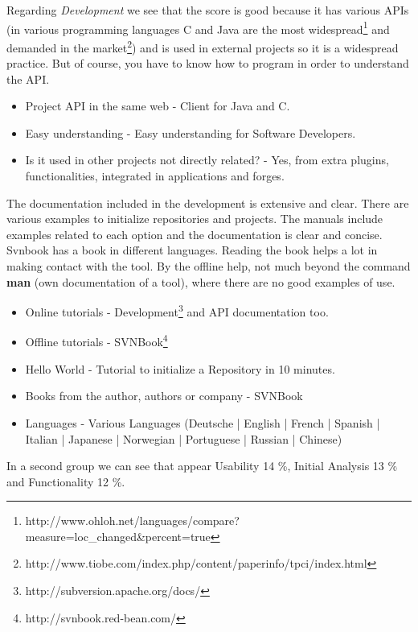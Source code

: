 \documentclass[11pt]{scrartcl}
\begin{document}
\par Regarding \emph{Development} we see that the score is good because it has various APIs (in various programming languages ​​C and Java are the most widespread\footnote{http://www.ohloh.net/languages/compare?measure=loc\_changed\&percent=true} and demanded in the market\footnote{http://www.tiobe.com/index.php/content/paperinfo/tpci/index.html}) and is used in external projects so it is a widespread practice. But of course, you have to know how to program in order to understand the API.

\begin{itemize}
    \item Project API in the same web - Client for Java and C.
    \item Easy understanding - Easy understanding for Software Developers. 
    \item Is it used in other projects not directly related? - Yes, from extra plugins, functionalities, integrated in applications and forges.
\end{itemize}
  
\par The documentation included in the development is extensive and clear. There are various examples to initialize repositories and projects. The manuals include examples related to each option and the documentation is clear and concise. Svnbook has a book in different languages. Reading the book helps a lot in making contact with the tool. By the offline help, not much beyond the command \textbf{man} (own documentation of a tool), where there are no good examples of use.

\begin{itemize}
    \item Online tutorials - Development\footnote{http://subversion.apache.org/docs/} and API documentation too.
    \item Offline tutorials - SVNBook\footnote{http://svnbook.red-bean.com/}
    \item Hello World - Tutorial to initialize a Repository in 10 minutes.
    \item Books from the author, authors or company -  SVNBook
    \item Languages - Various Languages (Deutsche | English | French | Spanish | Italian | Japanese | Norwegian | Portuguese | Russian | Chinese)
\end{itemize}

\par In a second group we can see that appear Usability 14 \%, Initial Analysis 13 \% and Functionality 12 \%.
\end{document}
